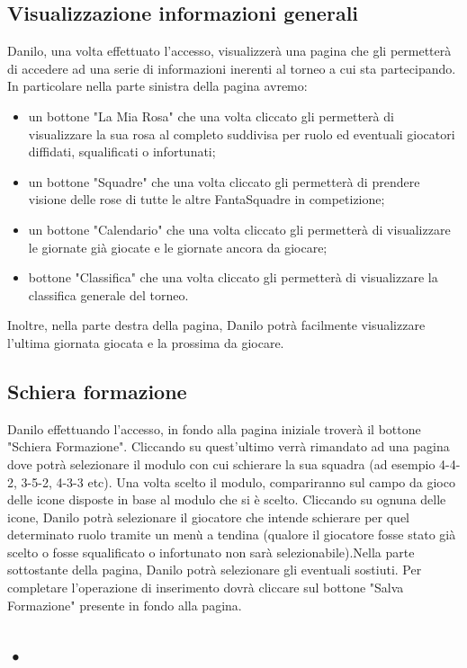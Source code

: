 \documentclass[12pt,a4paper]{article}
\begin{document}
\subsection{Visualizzazione informazioni generali}
Danilo, una volta effettuato l'accesso, visualizzerà una pagina che gli permetterà di accedere ad una serie di informazioni inerenti al torneo a cui sta partecipando. In particolare nella parte sinistra della pagina avremo:
\begin{itemize}
\item un bottone "La Mia Rosa" che una volta cliccato gli permetterà di visualizzare la sua rosa al completo suddivisa per ruolo ed eventuali giocatori diffidati, squalificati o infortunati;
\item un bottone "Squadre" che una volta cliccato gli permetterà di prendere visione delle rose di tutte le altre FantaSquadre in competizione;
\item un bottone "Calendario" che una volta cliccato gli permetterà di visualizzare le giornate già giocate e le giornate ancora da giocare;
\item bottone "Classifica" che una volta cliccato gli permetterà di visualizzare la classifica generale del torneo.
\end{itemize}
Inoltre, nella parte destra della pagina, Danilo potrà facilmente visualizzare l'ultima giornata giocata e la prossima da giocare.
\subsection{Schiera formazione}
Danilo effettuando l'accesso, in fondo alla pagina iniziale troverà il bottone "Schiera Formazione". Cliccando su quest'ultimo verrà rimandato ad una pagina dove potrà selezionare il modulo con cui schierare la sua squadra (ad esempio 4-4-2, 3-5-2, 4-3-3 etc). Una volta scelto il modulo, compariranno sul campo da gioco delle icone disposte in base al modulo che si è scelto. Cliccando su ognuna delle icone, Danilo potrà selezionare il giocatore che intende schierare per quel determinato ruolo tramite un menù a tendina (qualore il giocatore fosse stato già scelto o fosse squalificato o infortunato non sarà selezionabile).Nella parte sottostante della pagina, Danilo potrà selezionare gli eventuali sostiuti. Per completare l'operazione di inserimento dovrà cliccare sul bottone "Salva Formazione" presente in fondo alla pagina.
\subsection{•}
\end{document}

